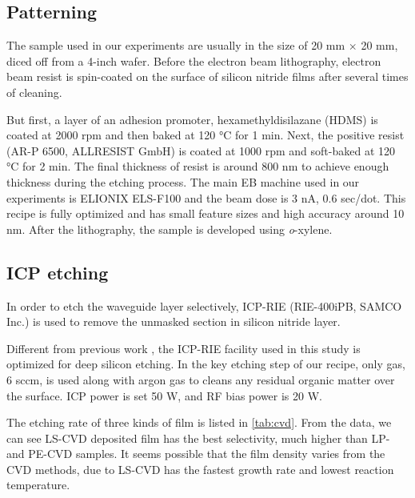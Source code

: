 \begin{figure}
	\centering
	
	\label{fig:ellipso}
\end{figure}



\subsection{Patterning}
The sample used in our experiments are usually in the size of 20 mm $\times$ 20 mm, diced off from a 4-inch wafer. Before the electron beam lithography, electron beam resist is spin-coated on the surface of silicon nitride films after several times of cleaning. 

But first, a layer of an adhesion promoter, hexamethyldisilazane (HDMS) is coated at 2000 rpm and then baked at 120 \si{\celsius} for 1 min. Next, the positive resist (AR-P 6500, ALLRESIST GmbH) is coated at 1000 rpm and soft-baked at 120 \si{\celsius} for 2 min. The final thickness of resist is around 800 nm to achieve enough thickness during the etching process. The main EB machine used in our experiments is ELIONIX ELS-F100 and the beam dose is 3 nA, 0.6 sec/dot. This recipe is fully optimized and has small feature sizes and high accuracy around 10 nm. After the lithography, the sample is developed using \textit{o}-xylene. 


\subsection{ICP etching}

In order to etch the waveguide layer selectively, ICP-RIE (RIE-400iPB, SAMCO Inc.) is used to remove the unmasked section in silicon nitride layer.

Different from previous work \cite{Yusuke2017}, the ICP-RIE facility used in this study is optimized for deep silicon etching. In the key etching step of our recipe, only  gas, 6 sccm, is used along with argon gas to cleans any residual organic matter over the surface. ICP power is set 50 W, and RF bias power is 20 W.

The etching rate of three kinds of film is listed in \autoref{tab:cvd}. From the data, we can see LS-CVD deposited film has the best selectivity, much higher than LP- and PE-CVD samples. It seems possible that the film density varies from the CVD methods, due to LS-CVD has the fastest growth rate and lowest reaction temperature.


